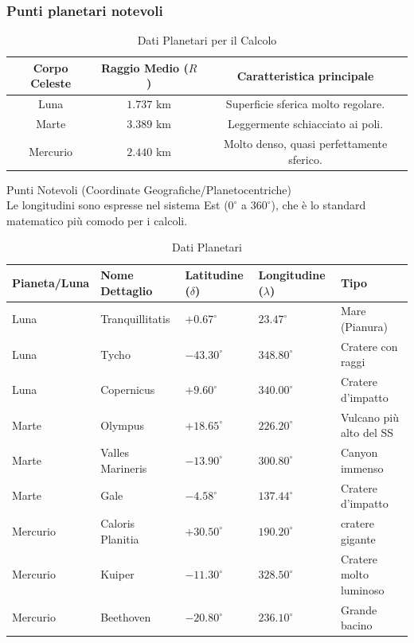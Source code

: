 \documentclass[a4paper,14pt]{article}
\begin{document}
\subsubsection{Punti planetari notevoli}
\begin{table}[h!]
\begin{center}
\begin{tabular}{|c|c|c|}
\hline
\textbf{Corpo Celeste}&\textbf{Raggio Medio} (\(R\)) & \textbf{Caratteristica principale}\\
\hline
Luna& \(1.737\) km& Superficie sferica molto regolare.\\
\hline
Marte& \(3.389\) km& Leggermente schiacciato ai poli.\\
\hline
Mercurio& \(2.440\) km& Molto denso, quasi perfettamente sferico.\\
\hline
\end{tabular}
\end{center}
\caption{Dati Planetari per il Calcolo}
\end{table}
Punti Notevoli (Coordinate Geografiche/Planetocentriche)\\
Le longitudini sono espresse nel sistema Est (\(0^{\circ }\) a \(360^{\circ }\)), che è lo standard matematico più comodo per i calcoli.\\
\begin{table}[h!]
\begin{center}
\begin{tabular}{|l|l|l|l|l|}
\hline
\textbf{Pianeta/Luna}&\textbf{Nome Dettaglio}& \textbf{Latitudine} (\(\delta \))& \textbf{Longitudine} (\(\lambda \))& \textbf{Tipo}\\
\hline
Luna& Tranquillitatis& \(+0.67^{\circ }\)& \(23.47^{\circ }\)& Mare (Pianura)\\
\hline
Luna& Tycho& \(-43.30^{\circ }\)& \(348.80^{\circ }\)& Cratere con raggi\\
\hline
Luna& Copernicus& \(+9.60^{\circ }\)& \(340.00^{\circ }\)& Cratere d'impatto\\
\hline
Marte& Olympus& \(+18.65^{\circ }\)& \(226.20^{\circ }\)& Vulcano più alto del SS\\
\hline
Marte& Valles Marineris& \(-13.90^{\circ } \)&\(300.80^{\circ }\)& Canyon immenso\\
\hline
Marte& Gale& \(-4.58^{\circ }\)& \(137.44^{\circ }\)& Cratere d'impatto\\
\hline
Mercurio& Caloris Planitia& \(+30.50^{\circ }\)& \(190.20^{\circ }\)& cratere gigante\\
\hline
Mercurio& Kuiper& \(-11.30^{\circ }\)& \(328.50^{\circ }\)& Cratere molto luminoso\\
\hline
Mercurio& Beethoven & \(-20.80^{\circ }\)& \(236.10^{\circ }\)& Grande bacino\\
\hline
\end{tabular}
\end{center}
\caption{Dati Planetari}
\end{table}
\end{document}
